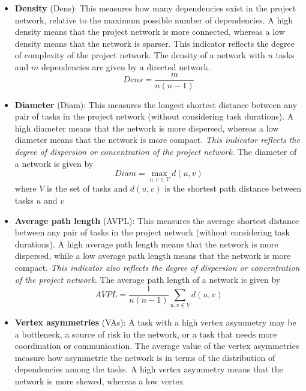 \documentclass[preprint,
3p]{elsarticle} %
\begin{document}
\begin{appendices}
\begin{itemize}
\item
  \textbf{Density} (Dens): This measures how many dependencies exist in
  the project network, relative to the maximum possible number of
  dependencies. A high density means that the project network is more
  connected, whereas a low density means that the network is sparser.
  This indicator reflects the degree of complexity of the project
  network. The density of a network with \(n\) tasks and \(m\)
  dependencies are given by a directed network. \begin{equation}
  Dens = \frac {m} {n(n-1)} \label{eq:Dens}
  \end{equation}
\item
  \textbf{Diameter} (Diam): This measures the longest shortest distance
  between any pair of tasks in the project network (without considering
  task durations). A high diameter means that the network is more
  dispersed, whereas a low diameter means that the network is more
  compact. \emph{This indicator reflects the degree of dispersion or
  concentration of the project network.} The diameter of a network is
  given by \begin{equation}
  Diam = \max_{u,v \in V} d(u,v) \label{eq:Diam}
  \end{equation} \noindent where \(V\) is the set of tasks and
  \(d(u,v)\) is the shortest path distance between tasks \(u\) and \(v\)
\item
  \textbf{Average path length} (AVPL): This measures the average
  shortest distance between any pair of tasks in the project network
  (without considering task durations). A high average path length means
  that the network is more dispersed, while a low average path length
  means that the network is more compact. \emph{This indicator also
  reflects the degree of dispersion or concentration of the project
  network}. The average path length of a network is given by
  \begin{equation}
  AVPL = \frac {1} {n(n-1)} \sum_{u,v \in V} d(u,v) \label{eq:AVPL}
  \end{equation} \noindent
\item
  \textbf{Vertex asymmetries} (VAs): A task with a high vertex asymmetry
  may be a bottleneck, a source of risk in the network, or a task that
  needs more coordination or communication. The average value of the
  vertex asymmetries measure how asymmetric the network is in terms of
  the distribution of dependencies among the tasks. A high vertex
  asymmetry means that the network is more skewed, whereas a low vertex

\end{itemize}
\end{appendices}
\end{document}
